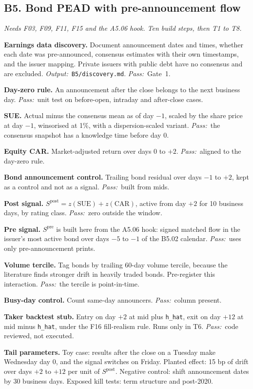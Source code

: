 \documentclass[11pt,letterpaper]{article}
\makeatletter
\newcommand{\code}[1]{\texttt{#1}}
\newcommand*{\twodigit}[1]{\expandafter\@twodigit\csname c@#1\endcsname}
\newcommand*{\@twodigit}[1]{\ifnum#1<10 0\fi\number#1}
\newcommand{\stepname}[1]{\textbf{#1.}}
\newcommand{\Out}{\textit{Output:}~}
\newcommand{\Pass}{\textit{Pass:}~}
\makeatother
\begin{document}
\subsection{B5. Bond PEAD with pre-announcement flow}
\emph{Needs F03, F09, F11, F15 and the A5.06 hook. Ten build steps, then T1 to T8.}
\begin{ladder}[label=\textbf{B5.\twodigit*}]
\item \stepname{Earnings data discovery} Document announcement dates and times, whether each date was pre-announced, consensus estimates with their own timestamps, and the issuer mapping. Private issuers with public debt have no consensus and are excluded. \Out \code{B5/discovery.md}. \Pass Gate~1.
\item \stepname{Day-zero rule} An announcement after the close belongs to the next business day. \Pass unit test on before-open, intraday and after-close cases.
\item \stepname{SUE} Actual minus the consensus mean as of day $-1$, scaled by the share price at day $-1$, winsorised at 1\%, with a dispersion-scaled variant. \Pass the consensus snapshot has a knowledge time before day 0.
\item \stepname{Equity CAR} Market-adjusted return over days 0 to $+2$. \Pass aligned to the day-zero rule.
\item \stepname{Bond announcement control} Trailing bond residual over days $-1$ to $+2$, kept as a control and not as a signal. \Pass built from mids.
\item \stepname{Post signal} $S^{\mathrm{post}}=z(\mathrm{SUE})+z(\mathrm{CAR})$, active from day $+2$ for 10 business days, by rating class. \Pass zero outside the window.
\item \stepname{Pre signal} $S^{\mathrm{pre}}$ is built here from the A5.06 hook: signed matched flow in the issuer's most active bond over days $-5$ to $-1$ of the B5.02 calendar. \Pass uses only pre-announcement prints.
\item \stepname{Volume tercile} Tag bonds by trailing 60-day volume tercile, because the literature finds stronger drift in heavily traded bonds. Pre-register this interaction. \Pass the tercile is point-in-time.
\item \stepname{Busy-day control} Count same-day announcers. \Pass column present.
\item \stepname{Taker backtest stub} Entry on day $+2$ at mid plus \code{h_hat}, exit on day $+12$ at mid minus \code{h_hat}, under the F16 fill-realism rule. Runs only in T6. \Pass code reviewed, not executed.
\end{ladder}
\textbf{Tail parameters.} Toy case: results after the close on a Tuesday make Wednesday day 0, and the signal switches on Friday. Planted effect: 15 bp of drift over days $+2$ to $+12$ per unit of $S^{\mathrm{post}}$. Negative control: shift announcement dates by 30 business days. Exposed kill tests: term structure and post-2020.
\end{document}
